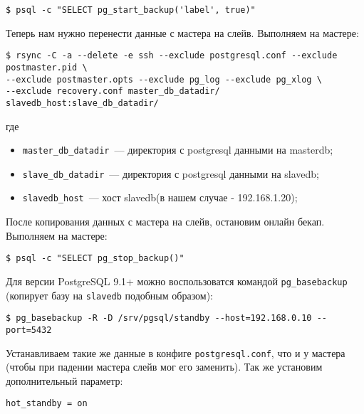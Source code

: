 \begin{lstlisting}[label=lst:streaming10,caption=Выполняем на мастере]
$ psql -c "SELECT pg_start_backup('label', true)"
\end{lstlisting}

Теперь нам нужно перенести данные с мастера на слейв. Выполняем на мастере:

\begin{lstlisting}[label=lst:streaming11,caption=Выполняем на мастере]
$ rsync -C -a --delete -e ssh --exclude postgresql.conf --exclude postmaster.pid \
--exclude postmaster.opts --exclude pg_log --exclude pg_xlog \
--exclude recovery.conf master_db_datadir/ slavedb_host:slave_db_datadir/
\end{lstlisting}

где

\begin{itemize}
  \item \lstinline!master_db_datadir!~--- директория с postgresql данными на masterdb;
  \item \lstinline!slave_db_datadir!~--- директория с postgresql данными на slavedb;
  \item \lstinline!slavedb_host!~--- хост slavedb(в нашем случае - 192.168.1.20);
\end{itemize}

После копирования данных с мастера на слейв, остановим онлайн бекап. Выполняем на мастере:

\begin{lstlisting}[label=lst:streaming12,caption=Выполняем на мастере]
$ psql -c "SELECT pg_stop_backup()"
\end{lstlisting}

Для версии PostgreSQL 9.1+ можно воспользоватся командой \lstinline!pg_basebackup! (копирует базу на \lstinline!slavedb! подобным образом):

\begin{lstlisting}[label=lst:streaming122,caption=Выполняем на слейве]
$ pg_basebackup -R -D /srv/pgsql/standby --host=192.168.0.10 --port=5432
\end{lstlisting}

Устанавливаем такие же данные в конфиге \lstinline!postgresql.conf!, что и у мастера (чтобы при падении мастера слейв мог его заменить). Так же установим дополнительный параметр:

\begin{lstlisting}[label=lst:streaming13,caption=Конфиг слейва]
hot_standby = on
\end{lstlisting}

